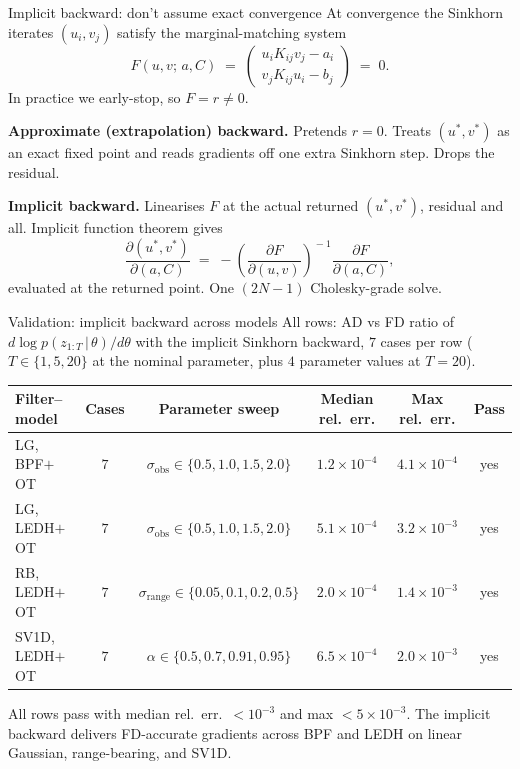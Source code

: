 \documentclass[10pt,aspectratio=169]{beamer}
\newcommand{\given}{\,|\,}
\begin{document}
\begin{frame}{Implicit backward: don't assume exact convergence}
  At convergence the Sinkhorn iterates $(u_i, v_j)$ satisfy the marginal-matching system
  \[
    F(u, v;\, a, C) \;=\; \begin{pmatrix} u_i K_{ij} v_j - a_i \\ v_j K_{ij} u_i - b_j \end{pmatrix} \;=\; 0.
  \]
  In practice we early-stop, so $F = r \neq 0$.

  \medskip
  \textbf{Approximate (extrapolation) backward.} Pretends $r = 0$. Treats $(u^*, v^*)$ as an exact fixed point and reads gradients off one extra Sinkhorn step. Drops the residual.

  \medskip
  \textbf{Implicit backward.} Linearises $F$ at the actual returned $(u^*, v^*)$, residual and all. Implicit function theorem gives
  \[
    \frac{\partial(u^*, v^*)}{\partial(a, C)} \;=\; -\!\left(\frac{\partial F}{\partial(u, v)}\right)^{\!-1}\!\frac{\partial F}{\partial(a, C)},
  \]
  evaluated at the returned point. One $(2N{-}1)$ Cholesky-grade solve.
\end{frame}


\begin{frame}{Validation: implicit backward across models}
  All rows: AD vs FD ratio of $d \log p(z_{1:T}\given\theta)/d\theta$ with the implicit Sinkhorn backward, $7$ cases per row ($T \in \{1, 5, 20\}$ at the nominal parameter, plus $4$ parameter values at $T = 20$).

  \medskip
  \begin{center}
  \footnotesize
  \begin{tabular}{l c c c c c}
    \toprule
    Filter--model & Cases & Parameter sweep & Median rel.\ err. & Max rel.\ err. & Pass \\
    \midrule
    LG, BPF$+$OT             & $7$ & $\sigma_\text{obs} \in \{0.5, 1.0, 1.5, 2.0\}$ & $1.2{\times}10^{-4}$ & $4.1{\times}10^{-4}$ & yes \\
    LG, LEDH$+$OT            & $7$ & $\sigma_\text{obs} \in \{0.5, 1.0, 1.5, 2.0\}$ & $5.1{\times}10^{-4}$ & $3.2{\times}10^{-3}$ & yes \\
    RB, LEDH$+$OT            & $7$ & $\sigma_\text{range} \in \{0.05, 0.1, 0.2, 0.5\}$ & $2.0{\times}10^{-4}$ & $1.4{\times}10^{-3}$ & yes \\
    SV1D, LEDH$+$OT          & $7$ & $\alpha \in \{0.5, 0.7, 0.91, 0.95\}$ & $6.5{\times}10^{-4}$ & $2.0{\times}10^{-3}$ & yes \\
    \bottomrule
  \end{tabular}
  \end{center}

  \medskip
  All rows pass with median rel.\ err.\ $< 10^{-3}$ and max $< 5\times 10^{-3}$. The implicit backward delivers FD-accurate gradients across BPF and LEDH on linear Gaussian, range-bearing, and SV1D.
\end{frame}
\end{document}
